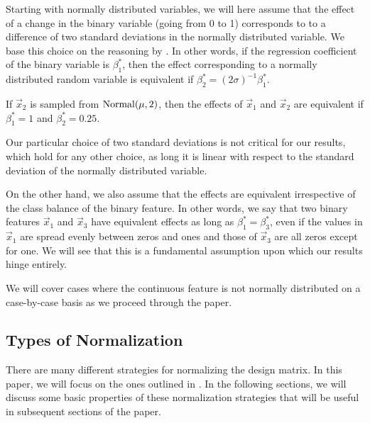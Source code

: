 Starting with normally distributed variables, we will here assume that the effect of a change in the binary variable (going from 0 to 1) corresponds to to a difference of two standard deviations in the normally distributed variable. We base this choice on the reasoning by \textcite{gelman2008}. In other words, if the regression coefficient of the binary variable is \(\beta^*_1\), then the effect corresponding to a normally distributed random variable is equivalent if \(\beta^*_2 = (2\sigma)^{-1} \beta_1^*\).

\begin{example}
  If \(\vec{x}_2\) is sampled from \(\operatorname{Normal}(\mu, 2)\), then the effects of \(\vec{x}_1\) and \(\vec{x}_2\) are equivalent if \(\beta_1^* = 1\) and \(\beta_2^* = 0.25\).
\end{example}

Our particular choice of two standard deviations is not critical for our results, which hold for any other choice, as long it is linear with respect to the standard deviation of the normally distributed variable.

On the other hand, we also assume that the effects are equivalent irrespective of the class balance of the binary feature. In other words, we say that two binary features \(\vec{x}_1\) and \(\vec{x}_3\) have equivalent effects as long as \(\beta_1^* = \beta_3^*\), even if the values in \(\vec{x}_1\) are spread evenly between zeros and ones and those of \(\vec{x}_3\) are all zeros except for one. We will see that this is a fundamental assumption upon which our results hinge entirely.

We will cover cases where the continuous feature is not normally distributed on a case-by-case basis as we proceed through the paper.

\subsection{Types of Normalization}

There are many different strategies for normalizing the design matrix. In this paper, we will focus on the ones outlined in .
In the following sections, we will discuss some basic properties of these normalization strategies that will be useful in subsequent sections of the paper.

